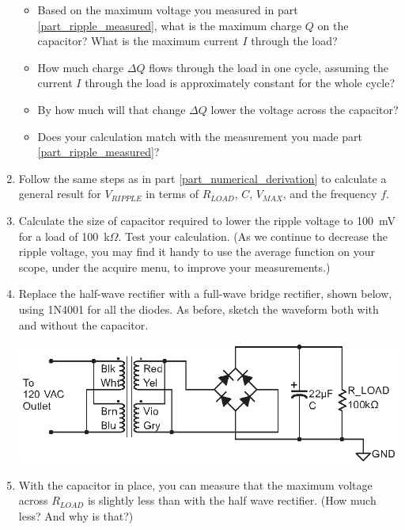 \begin{enumerate}[wide]
\begin{itemize}
\item Based on the maximum voltage you measured in part \ref{part_ripple_measured}, what is the maximum charge $Q$ on the capacitor?  What is the maximum current $I$ through the load?  \label{part_numerical_derivation}

\item How much charge $\Delta Q$ flows through the load in one cycle, assuming the current $I$ through the load is approximately constant for the whole cycle?  

\item By how much will that change $\Delta Q$ lower the voltage across the capacitor?  

\item Does your calculation match with the measurement you made part \ref{part_ripple_measured}?  
\end{itemize}

\item Follow the same steps as in part \ref{part_numerical_derivation} to calculate a general result for $V_{RIPPLE}$ in terms of $R_{LOAD}$, $C$,  $V_{MAX}$, and the frequency $f$. \label{part_symbolic_derivation}

\item Calculate the size of capacitor required to lower the ripple voltage to 100~mV for a load of 100~k$\Omega$.  Test your calculation.  (As we continue to decrease the ripple voltage, you may find it handy to use the average function on your scope, under the acquire menu, to improve your measurements.)

\item Replace the half-wave rectifier with a full-wave bridge rectifier, shown below, using 1N4001 for all the diodes.  As before, sketch the waveform both with and without the capacitor.
\begin{center}
\includegraphics{power_supply/full_wave_bridge_rectifier.eps}
\end{center}

\item With the capacitor in place, you can measure that the maximum voltage across $R_{LOAD}$ is slightly less than with the half wave rectifier.  (How much less?  And why is that?)  


\end{enumerate}
